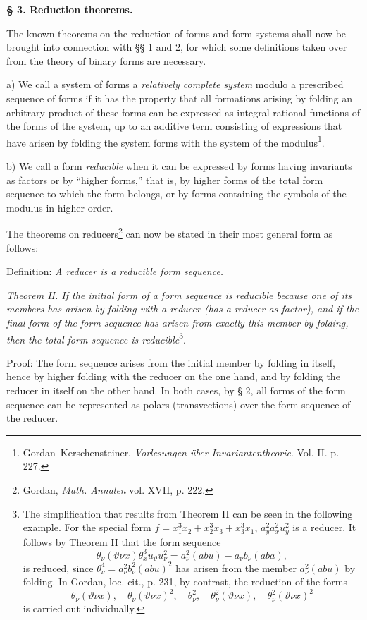 \documentclass[11pt]{article}
\begin{document}
\begin{center}
\textbf{§ 3. \quad Reduction theorems.}
\end{center}

The known theorems on the reduction of forms and form systems shall now be brought into connection with §§ 1 and 2, for which some definitions taken over from the theory of binary forms are necessary.

a) We call a system of forms a \emph{relatively complete system} modulo a prescribed sequence of forms if it has the property that all formations arising by folding an arbitrary product of these forms can be expressed as integral rational functions of the forms of the system, up to an additive term consisting of expressions that have arisen by folding the system forms with the system of the modulus\footnote{Gordan--Kerschensteiner, \emph{Vorlesungen über Invariantentheorie}. Vol. II. p. 227.}.

b) We call a form \emph{reducible} when it can be expressed by forms having invariants as factors or by ``higher forms,'' that is, by higher forms of the total form sequence to which the form belongs, or by forms containing the symbols of the modulus in higher order.

The theorems on reducers\footnote{Gordan, \emph{Math. Annalen} vol. XVII, p. 222.} can now be stated in their most general form as follows:

Definition: \emph{A reducer is a reducible form sequence.}

\emph{Theorem II. If the initial form of a form sequence is reducible because one of its members has arisen by folding with a reducer (has a reducer as factor), and if the final form of the form sequence has arisen from exactly this member by folding, then the total form sequence is reducible}\footnote{The simplification that results from Theorem II can be seen in the following example. For the special form $f=x_1^3x_2+x_2^3x_3+x_3^3x_1$, $a_y^2a_x^2u_y^2$ is a reducer. It follows by Theorem II that the form sequence
\[
\theta_\nu(\vartheta\nu x)\theta_x^3u_\vartheta u_\nu^2
=
a_\nu^2(abu)-a_\nu b_\nu(aba),
\]
is reduced, since $\theta_\nu^4=a_\nu^2b_\nu^2(abu)^2$ has arisen from the member $a_\nu^2(abu)$ by folding. In Gordan, loc. cit., p. 231, by contrast, the reduction of the forms
\[
\theta_\nu(\vartheta\nu x),\quad \theta_\nu(\vartheta\nu x)^2,\quad
\theta_\nu^2,\quad \theta_\nu^2(\vartheta\nu x),\quad
\theta_\nu^2(\vartheta\nu x)^2
\]
is carried out individually.}.

Proof: The form sequence arises from the initial member by folding in itself, hence by higher folding with the reducer on the one hand, and by folding the reducer in itself on the other hand. In both cases, by § 2, all forms of the form sequence can be represented as polars (transvections) over the form sequence of the reducer.
\end{document}
